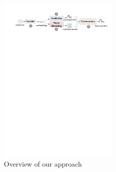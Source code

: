 



\begin{figure}[t!]
\begin{center}
\includegraphics[width=0.52\textwidth]{figures/overview.pdf}	
\caption{Overview of our approach}
\label{fig: denoise_framework}
\end{center}
\end{figure}


